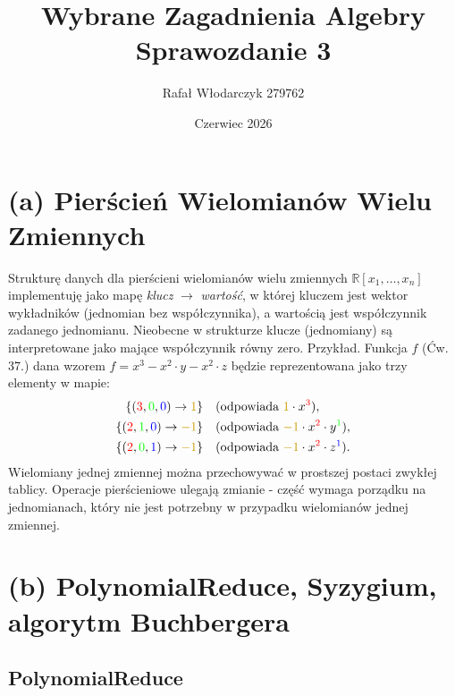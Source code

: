 \documentclass[10pt, a4paper]{article}
\title{Wybrane Zagadnienia Algebry\\Sprawozdanie 3}
\author{Rafał Włodarczyk 279762}
\date{Czerwiec 2026}
\begin{document}
\maketitle

\section{(a) Pierścień Wielomianów Wielu Zmiennych}

Strukturę danych dla pierścieni wielomianów wielu zmiennych $\mathbb{R}[x_1,\dots,x_n]$ implementuję 
jako mapę \textit{klucz} $\to$ \textit{wartość}, w której kluczem jest wektor wykładników (jednomian bez współczynnika), 
a wartością jest współczynnik zadanego jednomianu. Nieobecne w strukturze klucze (jednomiany) są interpretowane jako mające współczynnik równy zero.
Przykład. Funkcja $f$ (Ćw. 37.) dana wzorem $f=x^3 - x^2\cdot y - x^2 \cdot z$ będzie reprezentowana jako trzy elementy w mapie:
\begin{align*}
\{({\color{red}3}, {\color{green}0}, {\color{blue}0}) \to {\color{darkyellow}1}\}  & \quad (\text{odpowiada } {\color{darkyellow}1} \cdot x^{{\color{red}3}}), \\
\{({\color{red}2}, {\color{green}1}, {\color{blue}0}) \to {\color{darkyellow}-1}\} & \quad (\text{odpowiada } {\color{darkyellow}-1} \cdot x^{{\color{red}2}} \cdot y^{{\color{green}1}}), \\
\{({\color{red}2}, {\color{green}0}, {\color{blue}1}) \to {\color{darkyellow}-1}\} & \quad (\text{odpowiada } {\color{darkyellow}-1} \cdot x^{{\color{red}2}} \cdot z^{{\color{blue}1}}).
\end{align*}
Wielomiany jednej zmiennej można przechowywać w prostszej postaci zwykłej tablicy.
Operacje pierścieniowe ulegają zmianie - część wymaga porządku na jednomianach, który nie jest
potrzebny w przypadku wielomianów jednej zmiennej.

\section{(b) PolynomialReduce, Syzygium, algorytm Buchbergera}

\subsection{PolynomialReduce}
\end{document}
